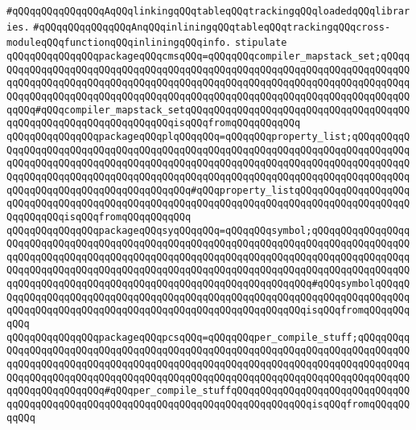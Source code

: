 \verb|#qQQqqQQqqQQqqQQqAqQQqlinkingqQQqtableqQQqtrackingqQQqloadedqQQqlibraries.|\newline
\verb|#qQQqqQQqqQQqqQQqAnqQQqinliningqQQqtableqQQqtrackingqQQqcross-moduleqQQqfunctionqQQqinliningqQQqinfo.|\newline
\newline
\newline
\verb|stipulate|\newline
\verb|qQQqqQQqqQQqqQQqpackageqQQqcmsqQQq=qQQqqQQqcompiler_mapstack_set;qQQqqQQqqQQqqQQqqQQqqQQqqQQqqQQqqQQqqQQqqQQqqQQqqQQqqQQqqQQqqQQqqQQqqQQqqQQqqQQqqQQqqQQqqQQqqQQqqQQqqQQqqQQqqQQqqQQqqQQqqQQqqQQqqQQqqQQqqQQqqQQqqQQqqQQqqQQqqQQqqQQqqQQqqQQqqQQqqQQqqQQqqQQqqQQqqQQqqQQqqQQqqQQqqQQqqQQqqQQq#qQQqcompiler_mapstack_setqQQqqQQqqQQqqQQqqQQqqQQqqQQqqQQqqQQqqQQqqQQqqQQqqQQqqQQqqQQqqQQqqQQqisqQQqfromqQQqqQQqqQQq|\newline
\verb|qQQqqQQqqQQqqQQqpackageqQQqplqQQqqQQq=qQQqqQQqproperty_list;qQQqqQQqqQQqqQQqqQQqqQQqqQQqqQQqqQQqqQQqqQQqqQQqqQQqqQQqqQQqqQQqqQQqqQQqqQQqqQQqqQQqqQQqqQQqqQQqqQQqqQQqqQQqqQQqqQQqqQQqqQQqqQQqqQQqqQQqqQQqqQQqqQQqqQQqqQQqqQQqqQQqqQQqqQQqqQQqqQQqqQQqqQQqqQQqqQQqqQQqqQQqqQQqqQQqqQQqqQQqqQQqqQQqqQQqqQQqqQQqqQQqqQQqqQQq#qQQqproperty_listqQQqqQQqqQQqqQQqqQQqqQQqqQQqqQQqqQQqqQQqqQQqqQQqqQQqqQQqqQQqqQQqqQQqqQQqqQQqqQQqqQQqqQQqqQQqqQQqqQQqisqQQqfromqQQqqQQqqQQq|\newline
\verb|qQQqqQQqqQQqqQQqpackageqQQqsyqQQqqQQq=qQQqqQQqsymbol;qQQqqQQqqQQqqQQqqQQqqQQqqQQqqQQqqQQqqQQqqQQqqQQqqQQqqQQqqQQqqQQqqQQqqQQqqQQqqQQqqQQqqQQqqQQqqQQqqQQqqQQqqQQqqQQqqQQqqQQqqQQqqQQqqQQqqQQqqQQqqQQqqQQqqQQqqQQqqQQqqQQqqQQqqQQqqQQqqQQqqQQqqQQqqQQqqQQqqQQqqQQqqQQqqQQqqQQqqQQqqQQqqQQqqQQqqQQqqQQqqQQqqQQqqQQqqQQqqQQqqQQqqQQqqQQqqQQqqQQq#qQQqsymbolqQQqqQQqqQQqqQQqqQQqqQQqqQQqqQQqqQQqqQQqqQQqqQQqqQQqqQQqqQQqqQQqqQQqqQQqqQQqqQQqqQQqqQQqqQQqqQQqqQQqqQQqqQQqqQQqqQQqqQQqqQQqqQQqisqQQqfromqQQqqQQqqQQq|\newline
\verb|qQQqqQQqqQQqqQQqpackageqQQqpcsqQQq=qQQqqQQqper_compile_stuff;qQQqqQQqqQQqqQQqqQQqqQQqqQQqqQQqqQQqqQQqqQQqqQQqqQQqqQQqqQQqqQQqqQQqqQQqqQQqqQQqqQQqqQQqqQQqqQQqqQQqqQQqqQQqqQQqqQQqqQQqqQQqqQQqqQQqqQQqqQQqqQQqqQQqqQQqqQQqqQQqqQQqqQQqqQQqqQQqqQQqqQQqqQQqqQQqqQQqqQQqqQQqqQQqqQQqqQQqqQQqqQQqqQQqqQQqqQQq#qQQqper_compile_stuffqQQqqQQqqQQqqQQqqQQqqQQqqQQqqQQqqQQqqQQqqQQqqQQqqQQqqQQqqQQqqQQqqQQqqQQqqQQqqQQqqQQqisqQQqfromqQQqqQQqqQQq|\newline
